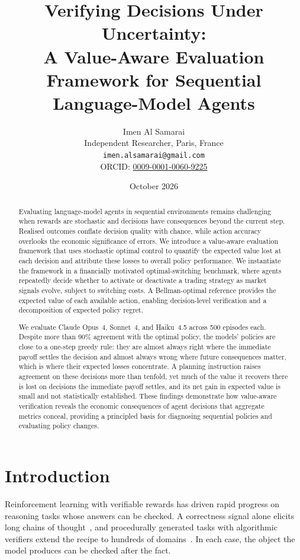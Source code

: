\documentclass[10pt,a4paper,twocolumn]{article}
\title{\vspace{-1.2em}Verifying Decisions Under Uncertainty:\\A Value-Aware Evaluation Framework for Sequential Language-Model Agents}
\author{Imen Al Samarai\\\small Independent Researcher, Paris, France\\\small\texttt{imen.alsamarai@gmail.com}\\\small ORCID: \href{https://orcid.org/0009-0001-0060-9225}{0009-0001-0060-9225}}
\date{\small October 2026}
\begin{document}
\maketitle

\begin{abstract}
\noindent Evaluating language-model agents in sequential environments remains challenging when rewards are stochastic and decisions have consequences beyond the current step. Realised outcomes conflate decision quality with chance, while action accuracy overlooks the economic significance of errors. We introduce a value-aware evaluation framework that uses stochastic optimal control to quantify the expected value lost at each decision and attribute these losses to overall policy performance. We instantiate the framework in a financially motivated optimal-switching benchmark, where agents repeatedly decide whether to activate or deactivate a trading strategy as market signals evolve, subject to switching costs. A Bellman-optimal reference provides the expected value of each available action, enabling decision-level verification and a decomposition of expected policy regret.

We evaluate Claude Opus~4, Sonnet~4, and Haiku~4.5 across 500 episodes each. Despite more than 90\% agreement with the optimal policy, the models' policies are close to a one-step greedy rule: they are almost always right where the immediate payoff settles the decision and almost always wrong where future consequences matter, which is where their expected losses concentrate. A planning instruction raises agreement on these decisions more than tenfold, yet much of the value it recovers there is lost on decisions the immediate payoff settles, and its net gain in expected value is small and not statistically established. These findings demonstrate how value-aware verification reveals the economic consequences of agent decisions that aggregate metrics conceal, providing a principled basis for diagnosing sequential policies and evaluating policy changes.
\end{abstract}

\section{Introduction}\label{sec:intro}

Reinforcement learning with verifiable rewards has driven rapid progress on reasoning tasks whose answers can be checked. A correctness signal alone elicits long chains of thought~\cite{deepseekr1}, and procedurally generated tasks with algorithmic verifiers extend the recipe to hundreds of domains~\cite{reasoninggym,rlve}. In each case, the object the model produces can be checked after the fact.
\end{document}
